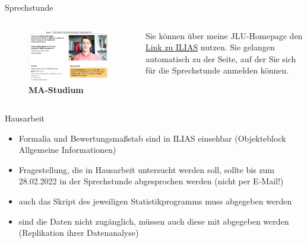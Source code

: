\documentclass[11pt]{beamer}
\begin{document}
\begin{frame}[t]{Sprechstunde}
	\begin{columns}
		\begin{column}{0.5\textwidth}
		\begin{figure}[ht]
		\includegraphics[width=\textwidth]{pics/pre6.png}
		\caption{\textbf{MA-Studium}}
	\end{figure}
		\end{column}
		\begin{column}{0.5\textwidth}
			Sie können über meine JLU-Homepage den \href{https://ilias.uni-giessen.de/ilias/goto.php?target=usr_172921&client_id=JLUG}{Link zu ILIAS} nutzen. Sie gelangen automatisch zu der Seite, auf der Sie sich für die Sprechstunde anmelden können.
		\end{column}
	\end{columns}
\end{frame}

\begin{frame}[t]{Hausarbeit}
	\begin{itemize}
		\item Formalia und Bewertungsmaßstab sind in ILIAS einsehbar (Objekteblock Allgemeine Informationen)
		\item Fragestellung, die in Hausarbeit untersucht werden soll, sollte bis zum 28.02.2022 in der Sprechstunde abgesprochen werden (nicht per E-Mail!)
		\item auch das Skript des jeweiligen Statistikprogramms muss abgegeben werden 
		\item sind die Daten nicht zugänglich, müssen auch diese mit abgegeben werden (Replikation ihrer Datenanalyse)
	\end{itemize}
\end{frame}
\end{document}
